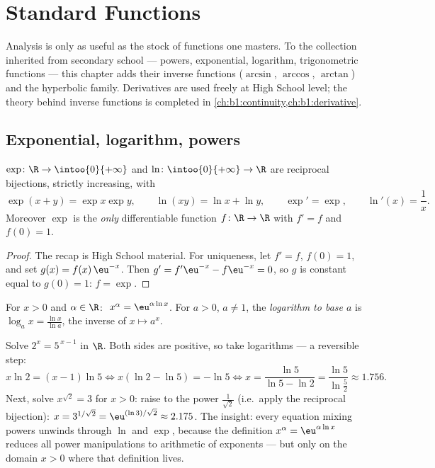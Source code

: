 \chapter{Standard Functions}\label{ch:b1:functions}

Analysis is only as useful as the stock of functions one masters. To
the collection inherited from secondary school --- powers, exponential,
logarithm, trigonometric functions --- this chapter adds their inverse
functions ($\arcsin$, $\arccos$, $\arctan$) and the hyperbolic family.
Derivatives are used freely at High School level; the
theory behind inverse functions is completed in
\cref{ch:b1:continuity,ch:b1:derivative}.

\section{Exponential, logarithm, powers}

\begin{proposition}\label{prop:b1:functions:expln}
$\exp \colon \R \to \intoo{0}{+\infty}$ and $\ln \colon
\intoo{0}{+\infty} \to \R$ are reciprocal bijections, strictly
increasing, with
\[
\exp(x + y) = \exp x \exp y, \qquad \ln(xy) = \ln x + \ln y,
\qquad \exp' = \exp, \qquad \ln'(x) = \frac 1x .
\]
Moreover $\exp$ is the \emph{only} differentiable function $f \colon
\R \to \R$ with $f' = f$ and $f(0) = 1$.
\end{proposition}

\begin{proof}
The recap is High School material. For uniqueness, let $f' = f$,
$f(0) = 1$, and set $g(x) = f(x)\,\eu^{-x}$. Then $g' = f'\eu^{-x} -
f\eu^{-x} = 0$, so $g$ is constant equal to $g(0) = 1$: $f = \exp$.
\end{proof}

\begin{definition}\label{def:b1:functions:powers}
For $x > 0$ and $\alpha \in \R$:
$\;x^\alpha = \eu^{\alpha \ln x}$. For $a > 0$,
$a \neq 1$, the \emph{logarithm to base $a$} is $\log_a x =
\frac{\ln x}{\ln a}$, the inverse of $x \mapsto a^x$.
\end{definition}

\begin{example}\label{ex:b1:functions:expequations}
Solve $2^x = 5^{\,x-1}$ in $\R$. Both sides are positive, so take
logarithms --- a reversible step:
\[
x\ln2 = (x - 1)\ln5
\iff x(\ln2 - \ln5) = -\ln5
\iff x = \frac{\ln5}{\ln5 - \ln2} = \frac{\ln 5}{\ln\frac52}
\approx 1.756 .
\]
Next, solve $x^{\sqrt2} = 3$ for $x > 0$: raise to the power
$\frac1{\sqrt2}$ (i.e.\ apply the reciprocal bijection):
$x = 3^{1/\sqrt2} = \eu^{(\ln 3)/\sqrt2} \approx 2.175$. The
insight: every equation mixing powers unwinds through $\ln$ and
$\exp$, because the definition $x^\alpha = \eu^{\alpha\ln x}$
reduces all power manipulations to arithmetic of exponents ---
but only on the domain $x > 0$ where that definition lives.
\end{example}

